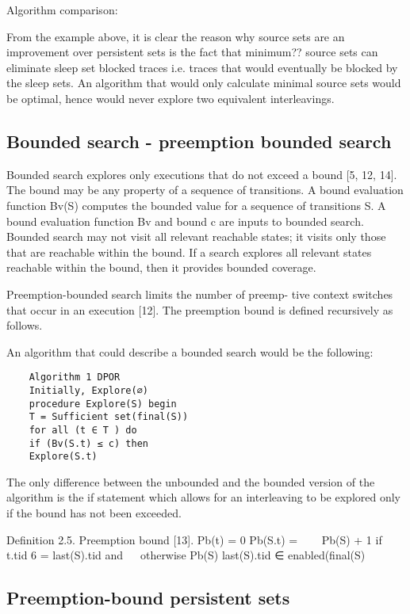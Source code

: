 \documentclass[a4paper,10pt]{article}
\begin{document}
Algorithm comparison:


From the example above, it is clear the reason why source sets are an improvement over persistent sets is the fact that minimum?? source sets can eliminate
sleep set blocked traces i.e. traces that would eventually be blocked by the sleep sets. An algorithm that would only calculate minimal source sets would be optimal, hence
would never explore two equivalent interleavings.

\subsection{Bounded search - preemption bounded search}
Bounded search explores only executions that do not exceed
a bound [5, 12, 14]. The bound may be any property of a
sequence of transitions. A bound evaluation function Bv(S)
computes the bounded value for a sequence of transitions S.
A bound evaluation function Bv and bound c are inputs to
bounded search. Bounded search may not visit all relevant
reachable states; it visits only those that are reachable within
the bound. If a search explores all relevant states reachable
within the bound, then it provides bounded coverage.

Preemption-bounded search limits the number of preemp-
tive context switches that occur in an execution [12]. The
preemption bound is defined recursively as follows.

An algorithm that could describe a bounded search would be the following:

\begin{verbatim}
    Algorithm 1 DPOR 
    Initially, Explore(∅)
    procedure Explore(S) begin
    T = Sufficient set(final(S))
    for all (t ∈ T ) do
    if (Bv(S.t) ≤ c) then
    Explore(S.t)
    \end{verbatim}

The only difference between the unbounded and the bounded version of the algorithm is the if statement which allows for an interleaving to be explored
only if the bound has not been exceeded.

Definition 2.5. Preemption bound [13].
Pb(t) = 0
Pb(S.t) =


 Pb(S) + 1 if t.tid 6 = last(S).tid and

 otherwise
Pb(S)
last(S).tid ∈ enabled(final(S)

\subsection{Preemption-bound persistent sets}
\end{document}
